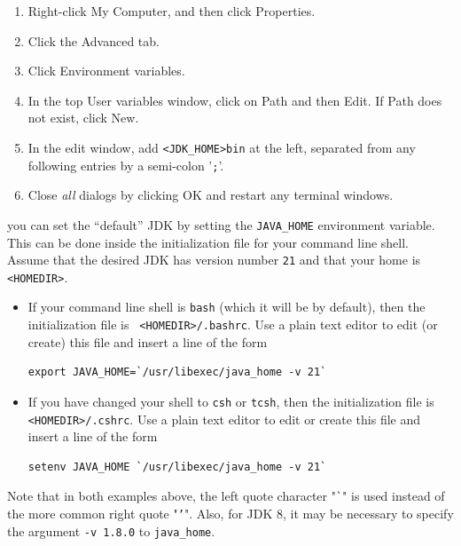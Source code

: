 \begin{enumerate}

\item Right-click {\sf My Computer}, and then click {\sf Properties}.

\item Click the {\sf Advanced} tab.

\item Click {\sf Environment variables}.

\item In the top {\sf User variables} window, click on {\sf Path} and 
then {\sf Edit}. If {\sf Path} does not exist, click {\sf New}.

\item In the edit window, add {\tt<JDK\_HOME>\BKS bin} at the
left, separated from any following entries by a semi-colon '{\tt ;}'.

\item Close {\it all} dialogs by clicking {\sf OK} and restart 
any terminal windows.

\end{enumerate}
\fi
\ifMacOS
you can set the ``default'' JDK by setting the {\tt JAVA\_HOME}
environment variable.  This can be done inside the
initialization file for your command line shell.
Assume that the desired JDK has version number {\tt 21} and
that your home \directory{} is {\tt <HOMEDIR>}. 

\begin{itemize}

\item If your command line shell is {\tt bash} (which
it will be by default), then the initialization file is {\tt
<HOMEDIR>/.bashrc}. Use a plain text editor to edit (or create) this file and
insert a line of the form
%
\begin{lstlisting}[]
  export JAVA_HOME=`/usr/libexec/java_home -v 21`
\end{lstlisting}
%

\item If you have changed your shell to {\tt csh} or {\tt tcsh},
then the initialization file is {\tt <HOMEDIR>/.cshrc}. Use a plain text editor
to edit or create this file and insert a line of the form
%
\begin{lstlisting}[]
  setenv JAVA_HOME `/usr/libexec/java_home -v 21`
\end{lstlisting}
%

\end{itemize}

Note that in both examples above, the left quote character "{\tt \`{}}" is used
instead of the more common right quote "{\tt '}".  Also, for JDK 8, it may be
necessary to specify the argument {\tt -v 1.8.0} to {\tt java\_home}.

